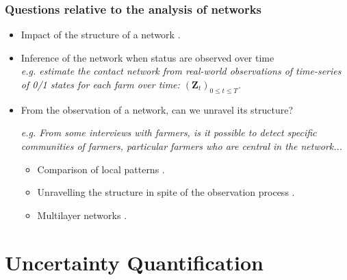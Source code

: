 \documentclass[nopagenumber,9pt]{beamer}
\newcommand{\bZ}{\mathbf{Z}}
\begin{document}
	\begin{frame}
	 \frametitle{Questions relative to the analysis of networks}

	 \begin{itemize}
	  \item Impact of the structure of a network \cite{barbillon2015network}.
	  \medskip

	  \item Inference of the network when status are observed over time \cite{barbillon2019epidemiologic}\\
	  \textit{e.g. estimate the contact network from real-world observations of time-series of 0/1 states for each farm over time: $(\bZ_t)_{0\le t\le T}$.}
	  \medskip


	  \item From the observation of a network, can we unravel its structure? \smallskip

	  \textit{e.g. From some interviews with farmers, is it possible to detect specific communities of farmers, particular farmers who are central in the network...}

	  \begin{itemize}
	   \item Comparison of local patterns \cite{thomasInventory}.
	\smallskip


	   \item Unravelling the structure in spite of the observation process \cite{tim,missSBM}.\smallskip

	   \item Multilayer networks \cite{barbillon2017stochastic,lazega2016effects,bar2018block,chabert2019stochastic}.
	  \smallskip

	  \end{itemize}




	 \end{itemize}


	\end{frame}



\section{Uncertainty Quantification}
\end{document}
